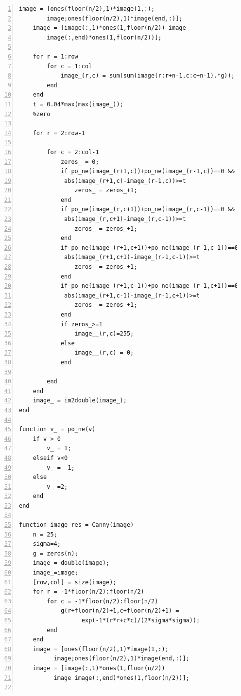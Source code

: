 \documentclass[11pt,oneside]{book}
\begin{document}
\begin{appendices}
\begin{lstlisting}[numbers=left, numberstyle=\tiny,keywordstyle=\color{blue!70},commentstyle=\color{red!50!green!50!blue!50},frame=shadowbox, rulesepcolor=\color{red!20!green!20!blue!20}]
    image = [ones(floor(n/2),1)*image(1,:);
        image;ones(floor(n/2),1)*image(end,:)];
    image = [image(:,1)*ones(1,floor(n/2)) image 
        image(:,end)*ones(1,floor(n/2))];
    
    for r = 1:row
        for c = 1:col
            image_(r,c) = sum(sum(image(r:r+n-1,c:c+n-1).*g));
        end
    end
    t = 0.04*max(max(image_));
    %zero
    
    for r = 2:row-1
        
        for c = 2:col-1
            zeros_ = 0;
            if po_ne(image_(r+1,c))+po_ne(image_(r-1,c))==0 &&
             abs(image_(r+1,c)-image_(r-1,c))>=t
                zeros_ = zeros_+1;
            end
            if po_ne(image_(r,c+1))+po_ne(image_(r,c-1))==0 &&
             abs(image_(r,c+1)-image_(r,c-1))>=t
                zeros_ = zeros_+1;
            end
            if po_ne(image_(r+1,c+1))+po_ne(image_(r-1,c-1))==0 &&
             abs(image_(r+1,c+1)-image_(r-1,c-1))>=t
                zeros_ = zeros_+1;
            end
            if po_ne(image_(r+1,c-1))+po_ne(image_(r-1,c+1))==0 &&
             abs(image_(r+1,c-1)-image_(r-1,c+1))>=t
                zeros_ = zeros_+1;
            end
            if zeros_>=1
                image__(r,c)=255;
            else
                image__(r,c) = 0;
            end
            
        end
    end
    image_ = im2double(image_);
end

function v_ = po_ne(v)
    if v > 0
        v_ = 1;
    elseif v<0
        v_ = -1;
    else
        v_ =2;
    end
end

function image_res = Canny(image)
    n = 25;
    sigma=4;
    g = zeros(n);
    image = double(image);
    image_=image;
    [row,col] = size(image);
    for r = -1*floor(n/2):floor(n/2)
        for c = -1*floor(n/2):floor(n/2)
            g(r+floor(n/2)+1,c+floor(n/2)+1) = 
                  exp(-1*(r*r+c*c)/(2*sigma*sigma));
        end
    end
    image = [ones(floor(n/2),1)*image(1,:);
          image;ones(floor(n/2),1)*image(end,:)];
    image = [image(:,1)*ones(1,floor(n/2)) 
          image image(:,end)*ones(1,floor(n/2))];
    

\end{lstlisting}
\end{appendices}
\end{document}
